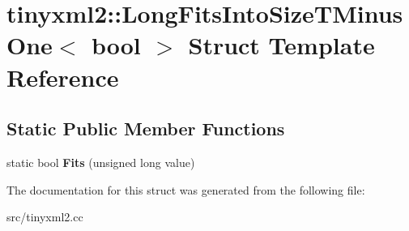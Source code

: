 \hypertarget{structtinyxml2_1_1LongFitsIntoSizeTMinusOne}{}\section{tinyxml2\+:\+:Long\+Fits\+Into\+Size\+T\+Minus\+One$<$ bool $>$ Struct Template Reference}
\label{structtinyxml2_1_1LongFitsIntoSizeTMinusOne}
\subsection*{Static Public Member Functions}
\begin{DoxyCompactItemize}
\item 
static bool {\bfseries Fits} (unsigned long value)\hypertarget{structtinyxml2_1_1LongFitsIntoSizeTMinusOne_a3057710104ab733963eb32fda0bc374c}{}\label{structtinyxml2_1_1LongFitsIntoSizeTMinusOne_a3057710104ab733963eb32fda0bc374c}

\end{DoxyCompactItemize}


The documentation for this struct was generated from the following file\+:\begin{DoxyCompactItemize}
\item 
src/tinyxml2.\+cc\end{DoxyCompactItemize}
